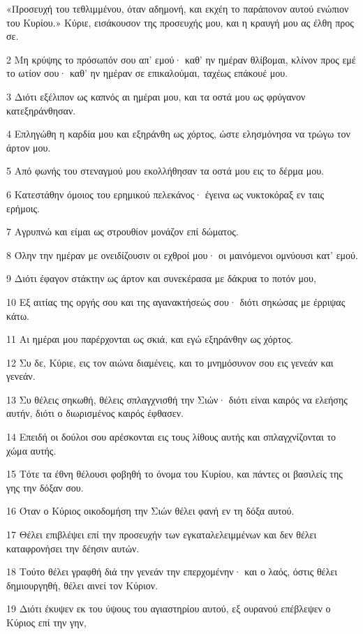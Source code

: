 \par «Προσευχή του τεθλιμμένου, όταν αδημονή, και εκχέη το παράπονον αυτού ενώπιον του Κυρίου.» Κύριε, εισάκουσον της προσευχής μου, και η κραυγή μου ας έλθη προς σε.
\par 2 Μη κρύψης το πρόσωπόν σου απ' εμού· καθ' ην ημέραν θλίβομαι, κλίνον προς εμέ το ωτίον σου· καθ' ην ημέραν σε επικαλούμαι, ταχέως επάκουέ μου.
\par 3 Διότι εξέλιπον ως καπνός αι ημέραι μου, και τα οστά μου ως φρύγανον κατεξηράνθησαν.
\par 4 Επληγώθη η καρδία μου και εξηράνθη ως χόρτος, ώστε ελησμόνησα να τρώγω τον άρτον μου.
\par 5 Από φωνής του στεναγμού μου εκολλήθησαν τα οστά μου εις το δέρμα μου.
\par 6 Κατεστάθην όμοιος του ερημικού πελεκάνος· έγεινα ως νυκτοκόραξ εν ταις ερήμοις.
\par 7 Αγρυπνώ και είμαι ως στρουθίον μονάζον επί δώματος.
\par 8 Όλην την ημέραν με ονειδίζουσιν οι εχθροί μου· οι μαινόμενοι ομνύουσι κατ' εμού.
\par 9 Διότι έφαγον στάκτην ως άρτον και συνεκέρασα με δάκρυα το ποτόν μου,
\par 10 Εξ αιτίας της οργής σου και της αγανακτήσεώς σου· διότι σηκώσας με έρριψας κάτω.
\par 11 Αι ημέραι μου παρέρχονται ως σκιά, και εγώ εξηράνθην ως χόρτος.
\par 12 Συ δε, Κύριε, εις τον αιώνα διαμένεις, και το μνημόσυνον σου εις γενεάν και γενεάν.
\par 13 Συ θέλεις σηκωθή, θέλεις σπλαγχνισθή την Σιών· διότι είναι καιρός να ελεήσης αυτήν, διότι ο διωρισμένος καιρός έφθασεν.
\par 14 Επειδή οι δούλοι σου αρέσκονται εις τους λίθους αυτής και σπλαγχνίζονται το χώμα αυτής.
\par 15 Τότε τα έθνη θέλουσι φοβηθή το όνομα του Κυρίου, και πάντες οι βασιλείς της γης την δόξαν σου.
\par 16 Όταν ο Κύριος οικοδομήση την Σιών θέλει φανή εν τη δόξα αυτού.
\par 17 Θέλει επιβλέψει επί την προσευχήν των εγκαταλελειμμένων και δεν θέλει καταφρονήσει την δέησιν αυτών.
\par 18 Τούτο θέλει γραφθή διά την γενεάν την επερχομένην· και ο λαός, όστις θέλει δημιουργηθή, θέλει αινεί τον Κύριον.
\par 19 Διότι έκυψεν εκ του ύψους του αγιαστηρίου αυτού, εξ ουρανού επέβλεψεν ο Κύριος επί την γην,
